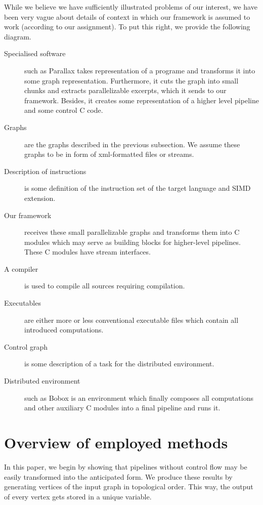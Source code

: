   While we believe we have sufficiently illustrated problems of our interest, we have been very vague about details of context in which our framework is assumed to work (according to our assignment). To put this right, we provide the following diagram.


\begin{description}
  \item[Specialised software] such as Parallax takes representation of a programe and transforms it into some graph representation. Furthermore, it cuts the graph into small chunks and extracts parallelizable excerpts, which it sends to our framework. Besides, it creates some representation of a higher level pipeline and some control C code.
  \item[Graphs] are the graphs described in the previous subsection. We assume these graphs to be in form of xml-formatted files or streams.
  \item[Description of instructions] is some definition of the instruction set of the target language and SIMD extension. 
  \item[Our framework] receives these small parallelizable graphs and transforms them into C modules which may serve as building blocks for higher-level pipelines. These C modules have stream interfaces.
  \item[A compiler] is used to compile all sources requiring compilation.
  \item[Executables] are either more or less conventional executable files which contain all introduced computations.
  \item[Control graph] is some description of a task for the distributed environment.
  \item[Distributed environment] such as Bobox \cite{bobox} is an environment which finally composes all computations and other auxiliary C modules into a final pipeline and runs it. 
\end{description}

\section{Overview of employed methods}

In this paper, we begin by showing that pipelines without control flow may be easily transformed into the anticipated form. We produce these results by generating vertices of the input graph in topological order. This way, the output of every vertex gets stored in a unique variable. 


